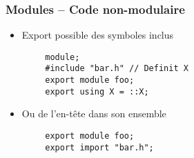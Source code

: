 \documentclass[C++.tex]{subfiles}
\begin{document}
\begin{frame}[fragile]
	\frametitle{Modules -- Code non-modulaire}
	\begin{itemize}
		\item Export possible des symboles inclus
	\end{itemize}

	\begin{verbatim}
		module;
		#include "bar.h" // Definit X
		export module foo;
		export using X = ::X;
	\end{verbatim}

	\begin{itemize}
		\item Ou de l'en-tête dans son ensemble
	\end{itemize}

	\begin{verbatim}
		export module foo;
		export import "bar.h";
	\end{verbatim}
\end{frame}
\end{document}
